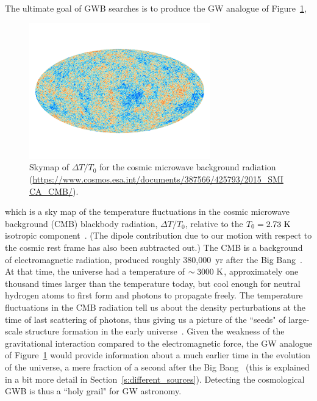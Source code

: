 The ultimate goal of GWB searches is to produce 
the GW analogue of Figure~\ref{f:CMB},
%
\begin{figure}[htbp!]
\begin{center}
\includegraphics[width=0.7\textwidth]{Figures/CMB}
\caption{Skymap of $\Delta T/T_0$ for the cosmic microwave background
radiation
(\url{https://www.cosmos.esa.int/documents/387566/425793/2015_SMICA_CMB/}).}
\label{f:CMB}
\end{center}
\end{figure}
%
which is a sky map of the temperature fluctuations in 
the cosmic microwave background (CMB) 
blackbody radiation, $\Delta T/T_0$, relative 
to the $T_0 = 2.73~{\rm K}$ isotropic 
component~\cite{Penzias-Wilson:1965, Dicke-et-al:1965}.
(The dipole contribution due to our motion with respect 
to the cosmic rest frame has also been subtracted out.)
The CMB is a background of electromagnetic
radiation, produced roughly 380,000~yr after the Big 
Bang~\cite{Kolb-Turner:1999, Ryden:2003}.
At that time, the universe had a temperature of 
$\sim 3000~{\rm K}$, approximately one thousand times 
larger than the temperature today, but cool enough for 
neutral hydrogen atoms to first form and photons to 
propagate freely.
The temperature fluctuations in the CMB radiation tell
us about the density perturbations at the time of 
last scattering of photons, 
thus giving us a picture of the ``seeds" of 
large-scale structure formation in the early 
universe~\cite{COBE:1992, CMB-anisotropies-Planck-Planck:2019}.
Given the weakness of the gravitational interaction 
compared to the electromagnetic force, the GW analogue 
of Figure~\ref{f:CMB} would provide information about
a much earlier time in the evolution of the universe,
a mere fraction of a second after the Big 
Bang~\cite{Allen:1997, Maggiore:2000} 
(this is explained in a bit more detail in 
Section~\ref{s:different_sources}).  
Detecting the cosmological GWB is thus a ``holy grail" 
for GW astronomy.

